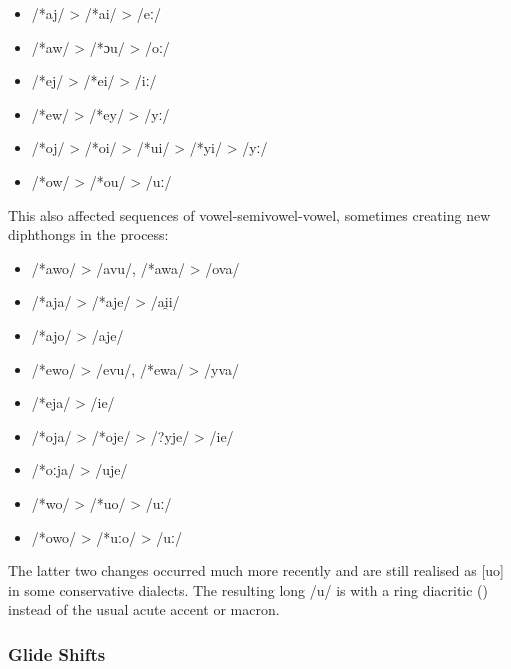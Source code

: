 \documentclass[grammar]{subfiles}
\begin{document}
\begin{description}
    \begin{itemize}
      \item /*aj/ > /*ai/ > /eː/
      \item /*aw/ > /*ɔu/ > /oː/
      \item /*ej/ > /*ei/ > /iː/
      \item /*ew/ > /*ey/ > /yː/
      \item /*oj/ > /*oi/ > /*ui/ > /*yi/ > /yː/
      \item /*ow/ > /*ou/ > /uː/
    \end{itemize}

    This also affected sequences of vowel-semivowel-vowel, sometimes creating
    new diphthongs in the process:

    \begin{itemize}
      \item /*awo/ > /avu/, /*awa/ > /ova/
      \item /*aja/ > /*aje/ > /ai̯i/
      \item /*ajo/ > /aje/
      \item /*ewo/ > /evu/, /*ewa/ > /yva/
      \item /*eja/ > /ie/
      \item /*oja/ > /*oje/ > /?yje/ > /ie/
      \item /*oːja/ > /uje/
      \item /*wo/ > /*uo/ > /uː/
      \item /*owo/ > /*uːo/ > /uː/
    \end{itemize}

    The latter two changes occurred much more recently and are still realised
    as [uo] in some conservative dialects. The resulting long /u/ is with a
    ring diacritic () instead of the usual acute accent or macron.


\end{description}

\Tbw

\subsubsection{Glide Shifts}
\label{sssec:history:east:glide_shifts}
\end{document}
